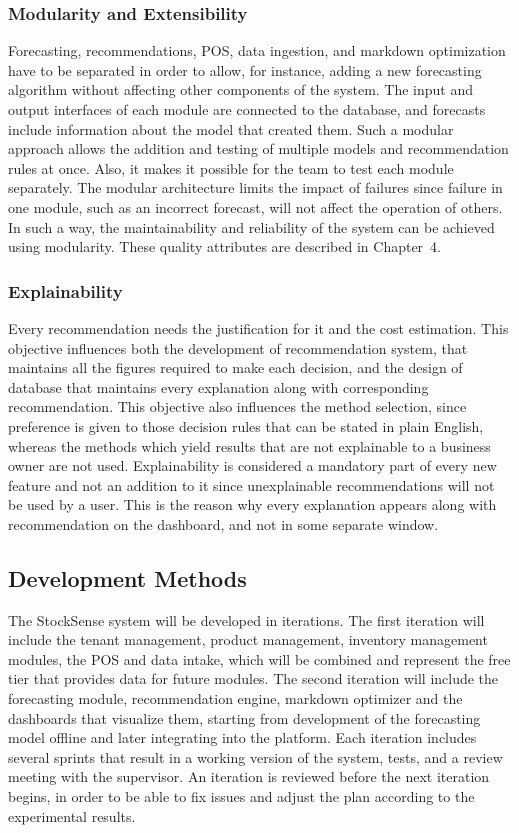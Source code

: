 \documentclass{StockSense}
\begin{document}
\subsubsection{Modularity and Extensibility}

Forecasting, recommendations, POS, data ingestion, and markdown optimization have to be separated in order to allow, for instance, adding a new forecasting algorithm without affecting other components of the system. The input and output interfaces of each module are connected to the database, and forecasts include information about the model that created them. Such a modular approach allows the addition and testing of multiple models and recommendation rules at once. Also, it makes it possible for the team to test each module separately. The modular architecture limits the impact of failures since failure in one module, such as an incorrect forecast, will not affect the operation of others. In such a way, the maintainability and reliability of the system can be achieved using modularity. These quality attributes are described in Chapter~4.

\subsubsection{Explainability}

Every recommendation needs the justification for it and the cost estimation. This objective influences both the development of recommendation system, that maintains all the figures required to make each decision, and the design of database that maintains every explanation along with corresponding recommendation. This objective also influences the method selection, since preference is given to those decision rules that can be stated in plain English, whereas the methods which yield results that are not explainable to a business owner are not used. Explainability is considered a mandatory part of every new feature and not an addition to it since unexplainable recommendations will not be used by a user. This is the reason why every explanation appears along with recommendation on the dashboard, and not in some separate window.

\subsection{Development Methods}

The StockSense system will be developed in iterations. The first iteration will include the tenant management, product management, inventory management modules, the POS and data intake, which will be combined and represent the free tier that provides data for future modules. The second iteration will include the forecasting module, recommendation engine, markdown optimizer and the dashboards that visualize them, starting from development of the forecasting model offline and later integrating into the platform. Each iteration includes several sprints that result in a working version of the system, tests, and a review meeting with the supervisor. An iteration is reviewed before the next iteration begins, in order to be able to fix issues and adjust the plan according to the experimental results.
\end{document}
